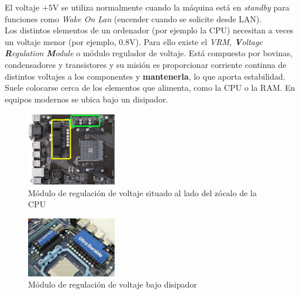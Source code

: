 \documentclass[12pt,spanish]{article}
\begin{document}
El voltaje $+5$V se utiliza normalmente cuando la máquina está en \textit{standby} para funciones como \textit{Wake On Lan} (encender cuando se solicite desde LAN).\\

Los distintos elementos de un ordenador (por ejemplo la CPU) necesitan a veces un voltaje menor (por ejemplo, 0.8V). Para ello existe el \textit{VRM, \textbf{V}oltage \textbf{R}egulation \textbf{M}odule} o módulo regulador de voltaje. Está compuesto por bovinas, condensadores y transistores y su misión es proporcionar corriente continua de distintos voltajes a los componentes y \textbf{mantenerla}, lo que aporta estabilidad. Suele colocarse cerca de los elementos que alimenta, como la CPU o la RAM. En equipos modernos se ubica bajo un disipador.

\begin{figure}[H]
	\centering
	\includegraphics[width=0.35\textwidth]{vrm.jpg}
	\caption{Módulo de regulación de voltaje situado al lado del zócalo de la CPU}
\end{figure}

\begin{figure}[H]
	\centering
	\includegraphics[width=0.35\textwidth]{vrm_disip.jpg}
	\caption{Módulo de regulación de voltaje bajo disipador}
\end{figure}
\end{document}

